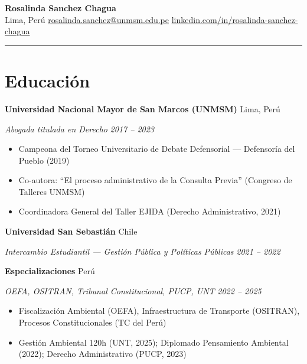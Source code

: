 \documentclass[10pt,letterpaper]{article}
\newcommand{\entry}[4]{%
  \noindent\textbf{#1} \hfill #2 \par\nopagebreak
  \textit{#3} \hfill \textit{#4} \par\nopagebreak
}
\begin{document}
\begin{center}
  {\Large\bfseries Rosalinda Sanchez Chagua} \\[3pt]
  \enspace Lima, Per\'u
  \quad{}\enspace \href{mailto:rosalinda.sanchez@unmsm.edu.pe}{rosalinda.sanchez@unmsm.edu.pe}
  \quad{}\enspace \href{https://pe.linkedin.com/in/rosalinda-sanchez-chagua-1b26061b1}{linkedin.com/in/rosalinda-sanchez-chagua}
\end{center}

\vspace{-0.4em}
\noindent\rule{\textwidth}{0.8pt}
\vspace{-0.6em}

\section{Educaci\'on}

\entry{Universidad Nacional Mayor de San Marcos (UNMSM)}{Lima, Per\'u}{Abogada titulada en Derecho}{2017 -- 2023}
\begin{itemize}
  \item Campeona del Torneo Universitario de Debate Defensorial --- Defensor\'ia del Pueblo (2019)
  \item Co-autora: ``El proceso administrativo de la Consulta Previa'' (Congreso de Talleres UNMSM)
  \item Coordinadora General del Taller EJIDA (Derecho Administrativo, 2021)
\end{itemize}
\vspace{0.2em}

\entry{Universidad San Sebasti\'an}{Chile}{Intercambio Estudiantil --- Gesti\'on P\'ublica y Pol\'iticas P\'ublicas}{2021 -- 2022}
\vspace{0.2em}

\entry{Especializaciones}{Per\'u}{OEFA, OSITRAN, Tribunal Constitucional, PUCP, UNT}{2022 -- 2025}
\begin{itemize}
  \item Fiscalizaci\'on Ambiental (OEFA), Infraestructura de Transporte (OSITRAN), Procesos Constitucionales (TC del Per\'u)
  \item Gesti\'on Ambiental 120h (UNT, 2025); Diplomado Pensamiento Ambiental (2022); Derecho Administrativo (PUCP, 2023)
\end{itemize}
\vspace{0.2em}
\end{document}

